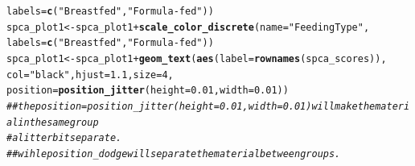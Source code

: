 \documentclass[12pt]{article}\usepackage[]{graphicx}\usepackage[]{color}
\makeatletter
\newcommand{\hlnum}[1]{\textcolor[rgb]{0.686,0.059,0.569}{#1}}%
\newcommand{\hlstr}[1]{\textcolor[rgb]{0.192,0.494,0.8}{#1}}%
\newcommand{\hlcom}[1]{\textcolor[rgb]{0.678,0.584,0.686}{\textit{#1}}}%
\newcommand{\hlopt}[1]{\textcolor[rgb]{0,0,0}{#1}}%
\newcommand{\hlstd}[1]{\textcolor[rgb]{0.345,0.345,0.345}{#1}}%
\newcommand{\hlkwb}[1]{\textcolor[rgb]{0.69,0.353,0.396}{#1}}%
\newcommand{\hlkwc}[1]{\textcolor[rgb]{0.333,0.667,0.333}{#1}}%
\newcommand{\hlkwd}[1]{\textcolor[rgb]{0.737,0.353,0.396}{\textbf{#1}}}%
\newenvironment{kframe}{%
 \def\at@end@of@kframe{}%
 \ifinner\ifhmode%
  \def\at@end@of@kframe{\end{minipage}}%
  \begin{minipage}{\columnwidth}%
 \fi\fi%
 \def\FrameCommand##1{\hskip\@totalleftmargin \hskip-\fboxsep
 \colorbox{shadecolor}{##1}\hskip-\fboxsep
     \hskip-\linewidth \hskip-\@totalleftmargin \hskip\columnwidth}%
 \MakeFramed {\advance\hsize-\width
   \@totalleftmargin\z@ \linewidth\hsize
   \@setminipage}}%
 {\par\unskip\endMakeFramed%
 \at@end@of@kframe}
\newenvironment{knitrout}{}{} %
\makeatother
\begin{document}
\begin{knitrout}
\begin{kframe}
\begin{alltt}
                                            \hlkwc{labels}\hlstd{=}\hlkwd{c}\hlstd{(}\hlstr{"Breastfed"}\hlstd{,}\hlstr{"Formula-fed"}\hlstd{))}
\hlstd{spca_plot1}\hlkwb{<-}\hlstd{spca_plot1}\hlopt{+}\hlkwd{scale_color_discrete}\hlstd{(}\hlkwc{name}\hlstd{=}\hlstr{"Feeding Type"}\hlstd{,}
                                            \hlkwc{labels}\hlstd{=}\hlkwd{c}\hlstd{(}\hlstr{"Breastfed"}\hlstd{,}\hlstr{"Formula-fed"}\hlstd{))}
\hlstd{spca_plot1}\hlkwb{<-}\hlstd{spca_plot1}\hlopt{+}\hlkwd{geom_text}\hlstd{(}\hlkwd{aes}\hlstd{(}\hlkwc{label}\hlstd{=}\hlkwd{rownames}\hlstd{(spca_scores)),}
                                 \hlkwc{col}\hlstd{=}\hlstr{"black"}\hlstd{,}\hlkwc{hjust}\hlstd{=}\hlnum{1.1}\hlstd{,}\hlkwc{size}\hlstd{=}\hlnum{4}\hlstd{,}
                                 \hlkwc{position}\hlstd{=}\hlkwd{position_jitter}\hlstd{(}\hlkwc{height}\hlstd{=}\hlnum{0.01}\hlstd{,}\hlkwc{width}\hlstd{=}\hlnum{0.01}\hlstd{))}
\hlcom{## the position=position_jitter(height=0.01,width=0.01) will make the material in the same group }
\hlcom{# a litter bit separate.}
\hlcom{## wihle position_dodge will separate the material between groups.}


\end{alltt}
\end{kframe}
\end{knitrout}
\end{document}
